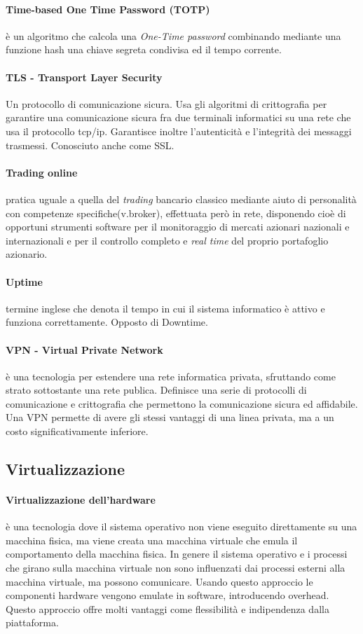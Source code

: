 \paragraph{Time-based One Time Password (TOTP)}
	è un algoritmo che calcola una \emph{One-Time password} combinando mediante una funzione hash una chiave segreta condivisa ed il tempo corrente. \cite{totprfc}
\paragraph{TLS - Transport Layer Security}
Un protocollo di comunicazione sicura. Usa gli algoritmi di crittografia per garantire una comunicazione sicura fra due terminali informatici su una rete che usa il protocollo tcp/ip.
Garantisce inoltre l'autenticit\`a e l'integrit\`a dei messaggi trasmessi.
Conosciuto anche come SSL.
\paragraph{Trading online}
	pratica uguale a quella del \emph{trading} bancario classico mediante aiuto di personalità con competenze specifiche(v.broker), effettuata però in rete, disponendo cioè di opportuni strumenti software per il monitoraggio di mercati azionari nazionali e internazionali e  per il controllo completo e \emph{real time} del proprio portafoglio azionario.
\paragraph{Uptime}
    termine inglese che denota il tempo in cui il sistema informatico \`e attivo e funziona correttamente.
    Opposto di Downtime.


\paragraph{VPN - Virtual Private Network}
        \`e una tecnologia per estendere una rete informatica privata, sfruttando come strato sottostante una rete publica.
    Definisce una serie di protocolli di comunicazione e crittografia che permettono la comunicazione sicura ed affidabile.
    Una VPN permette di avere gli stessi vantaggi di una linea privata, ma a un costo significativamente inferiore.
\subsection{Virtualizzazione}
\paragraph{Virtualizzazione dell'hardware}
\`e una tecnologia dove il sistema operativo non viene eseguito direttamente su una macchina fisica, ma viene creata una macchina virtuale che emula il comportamento della macchina fisica. In genere il sistema operativo e i processi che girano sulla macchina virtuale non sono influenzati dai processi esterni alla macchina virtuale, ma possono comunicare.
Usando questo approccio le componenti hardware vengono emulate in software, introducendo overhead.
Questo approccio offre molti vantaggi come flessibilit\`a e indipendenza dalla piattaforma.
